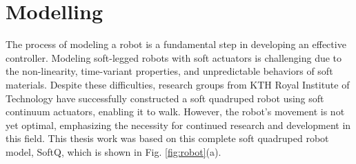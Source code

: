 \section{Modelling}
The process of modeling a robot is a fundamental step in developing an effective controller. Modeling soft-legged robots with soft actuators is challenging due to the non-linearity, time-variant properties, and unpredictable behaviors of soft materials. Despite these difficulties, research groups from KTH Royal Institute of Technology\cite{jiSynthesizingOptimalGait2022, daneliaStructureGaitOptimizationof2021, thorapallimuralidharanContinuumActuatorBased2020, jiLearningbasedControl4D2022} have successfully constructed a soft quadruped robot using soft continuum actuators, enabling it to walk. However, the robot's movement is not yet optimal, emphasizing the necessity for continued research and development in this field. This thesis work was based on this complete soft quadruped robot model, SoftQ, which is shown in Fig. \ref{fig:robot}(a). 

